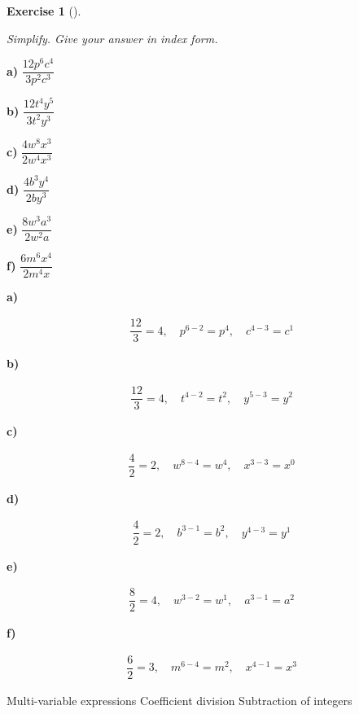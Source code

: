 \documentclass[
  letterpaper,
  DIV=11,
  numbers=noendperiod]{scrreprt}
\theoremstyle{definition}
\newtheorem{exercise}{Exercise}[chapter]
\theoremstyle{remark}
\begin{document}
\begin{exercise}[]\protect\hypertarget{exr-u2-7}{}\label{exr-u2-7}

\emph{Simplify. Give your answer in index form.}

\textbf{a)} \(\displaystyle \dfrac{12p^{6}c^{4}}{3p^{2}c^{3}}\)

\textbf{b)} \(\displaystyle \dfrac{12t^{4}y^{5}}{3t^{2}y^{3}}\)

\textbf{c)} \(\displaystyle \dfrac{4w^{8}x^{3}}{2w^{4}x^{3}}\)

\textbf{d)} \(\displaystyle \dfrac{4b^{3}y^{4}}{2by^{3}}\)

\textbf{e)} \(\displaystyle \dfrac{8w^{3}a^{3}}{2w^{2}a}\)

\textbf{f)} \(\displaystyle \dfrac{6m^{6}x^{4}}{2m^{4}x}\)

\begin{tcolorbox}[enhanced jigsaw, opacitybacktitle=0.6, coltitle=black, arc=.35mm, colframe=quarto-callout-tip-color-frame, colback=white, bottomrule=.15mm, left=2mm, colbacktitle=quarto-callout-tip-color!10!white, titlerule=0mm, opacityback=0, title=\textcolor{quarto-callout-tip-color}{\faLightbulb}\hspace{0.5em}{🔍 View Solutions}, leftrule=.75mm, breakable, rightrule=.15mm, bottomtitle=1mm, toptitle=1mm, toprule=.15mm]

\textbf{a)}

\[
\begin{aligned}
\dfrac{12}{3}=4,\quad p^{6-2}=p^{4},\quad c^{4-3}=c^{1}
\end{aligned}
\]

\textbf{b)}

\[
\begin{aligned}
\dfrac{12}{3}=4,\quad t^{4-2}=t^{2},\quad y^{5-3}=y^{2}
\end{aligned}
\]

\textbf{c)}

\[
\begin{aligned}
\dfrac{4}{2}=2,\quad w^{8-4}=w^{4},\quad x^{3-3}=x^{0}
\end{aligned}
\]

\textbf{d)}

\[
\begin{aligned}
\dfrac{4}{2}=2,\quad b^{3-1}=b^{2},\quad y^{4-3}=y^{1}
\end{aligned}
\]

\textbf{e)}

\[
\begin{aligned}
\dfrac{8}{2}=4,\quad w^{3-2}=w^{1},\quad a^{3-1}=a^{2}
\end{aligned}
\]

\textbf{f)}

\[
\begin{aligned}
\dfrac{6}{2}=3,\quad m^{6-4}=m^{2},\quad x^{4-1}=x^{3}
\end{aligned}
\]

\end{tcolorbox}

{Multi-variable expressions} {Coefficient division} {Subtraction of
integers}

\end{exercise}
\end{document}

